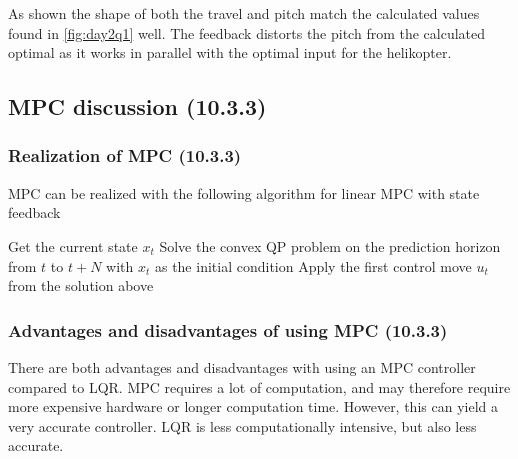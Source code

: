 As shown the shape of both the travel and pitch match the calculated values found in \ref{fig:day2q1} well. The feedback distorts the pitch from the calculated optimal as it works in parallel with the optimal input for the helikopter.

\subsection{MPC discussion (10.3.3)}

\subsubsection{Realization of MPC (10.3.3)}
MPC can be realized with the following algorithm for linear MPC with state feedback

\begin{algorithmic}
\State Get the current state $x_t$
\State Solve the convex QP problem on the prediction horizon from $t$ to $t+N$ with $x_t$ as the initial condition
\State Apply the first control move $u_t$ from the solution above
\EndFor
\end{algorithmic}

\subsubsection{Advantages and disadvantages of using MPC (10.3.3)}
There are both advantages and disadvantages with using an MPC controller compared to LQR.   
MPC requires a lot of computation, and may therefore require more expensive hardware or longer computation time. However, this can yield a very accurate controller. LQR is less computationally intensive, but also less accurate.

